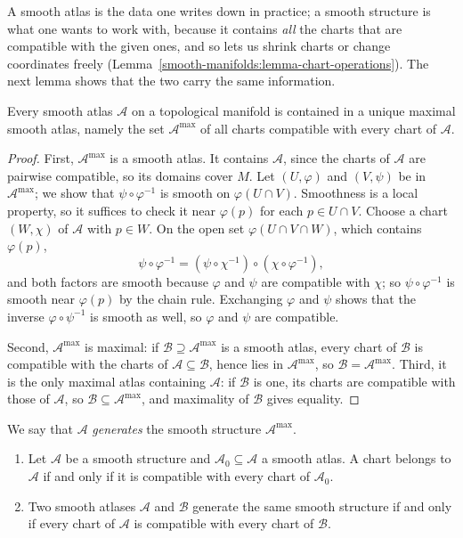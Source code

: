 A smooth atlas is the data one writes down in practice; a smooth structure is what one wants to work with, because it contains \emph{all} the charts that are
compatible with the given ones, and so lets us shrink charts or change coordinates freely (Lemma~\ref{smooth-manifolds:lemma-chart-operations}). The next lemma
shows that the two carry the same information.

\begin{lemma}\label{smooth-manifolds:lemma-maximal-atlas}
Every smooth atlas $\mathcal{A}$ on a topological manifold is contained in a unique maximal smooth atlas, namely the set $\mathcal{A}^{\max}$ of all charts
compatible with every chart of $\mathcal{A}$.
\end{lemma}

\begin{proof}
First, $\mathcal{A}^{\max}$ is a smooth atlas. It contains $\mathcal{A}$, since the charts of $\mathcal{A}$ are pairwise compatible, so its domains cover $M$. Let
$(U, \varphi)$ and $(V, \psi)$ be in $\mathcal{A}^{\max}$; we show that $\psi \circ \varphi^{-1}$ is smooth on $\varphi(U \cap V)$. Smoothness is a local
property, so it suffices to check it near $\varphi(p)$ for each $p \in U \cap V$. Choose a chart $(W, \chi)$ of $\mathcal{A}$ with $p \in W$. On the open set
$\varphi(U \cap V \cap W)$, which contains $\varphi(p)$,
\[
\psi \circ \varphi^{-1} = (\psi \circ \chi^{-1}) \circ (\chi \circ \varphi^{-1}),
\]
and both factors are smooth because $\varphi$ and $\psi$ are compatible with $\chi$; so $\psi \circ \varphi^{-1}$ is smooth near $\varphi(p)$ by the chain rule.
Exchanging $\varphi$ and $\psi$ shows that the inverse $\varphi \circ \psi^{-1}$ is smooth as well, so $\varphi$ and $\psi$ are compatible.

Second, $\mathcal{A}^{\max}$ is maximal: if $\mathcal{B} \supseteq \mathcal{A}^{\max}$ is a smooth atlas, every chart of $\mathcal{B}$ is compatible with the
charts of $\mathcal{A} \subseteq \mathcal{B}$, hence lies in $\mathcal{A}^{\max}$, so $\mathcal{B} = \mathcal{A}^{\max}$. Third, it is the only maximal atlas
containing $\mathcal{A}$: if $\mathcal{B}$ is one, its charts are compatible with those of $\mathcal{A}$, so $\mathcal{B} \subseteq \mathcal{A}^{\max}$, and
maximality of $\mathcal{B}$ gives equality.
\end{proof}

We say that $\mathcal{A}$ \emph{generates} the smooth structure $\mathcal{A}^{\max}$.

\begin{corollary}\label{smooth-manifolds:corollary-same-structure}
\begin{enumerate}
\item Let $\mathcal{A}$ be a smooth structure and $\mathcal{A}_0 \subseteq \mathcal{A}$ a smooth atlas. A chart belongs to $\mathcal{A}$ if and only if it is
compatible with every chart of $\mathcal{A}_0$.
\item Two smooth atlases $\mathcal{A}$ and $\mathcal{B}$ generate the same smooth structure if and only if every chart of $\mathcal{A}$ is compatible with
every chart of $\mathcal{B}$.
\end{enumerate}
\end{corollary}


